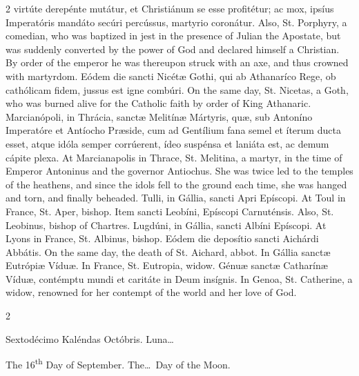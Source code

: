 \begin{paracol}{2}
 virtúte derepénte mutátur, et Christiánum se esse profitétur; ac mox, ipsíus 
 Imperatóris mandáto secúri percússus, martyrio coronátur.
\switchcolumn
{}
Also, St. Porphyry, a comedian, who 
 was baptized in jest in the presence of Julian the Apostate, but was 
 suddenly converted by the power of God and declared himself a Christian. 
 By order of the emperor he was thereupon struck with an axe, and thus 
 crowned with martyrdom.
\switchcolumn*
{}
Eódem die sancti Nicétæ 
 Gothi, qui ab Athanaríco Rege, ob cathólicam fidem, jussus est igne combúri.
\switchcolumn
{}
On the same day, St. Nicetas, a 
 Goth, who was burned alive for the Catholic faith by order of King Athanaric.
\switchcolumn*
{}
Marcianópoli, in 
 Thrácia, sanctæ Melitínæ Mártyris, quæ, sub Antoníno Imperatóre et Antíocho 
 Præside, cum ad Gentílium fana semel et íterum ducta esset, atque idóla 
 semper corrúerent, ídeo suspénsa et laniáta est, ac demum cápite plexa.
\switchcolumn
{}
At Marcianapolis in Thrace, St. 
 Melitina, a martyr, in the time of Emperor Antoninus and the governor 
 Antiochus. She was twice led to the temples of the heathens, and since 
 the idols fell to the ground each time, she was hanged and torn, and finally 
 beheaded.
\switchcolumn*
{}
Tulli, in Gállia, 
 sancti Apri Epíscopi.
\switchcolumn
{}
At Toul in France, St. Aper, bishop.
\switchcolumn*
{}
Item sancti Leobíni, 
 Epíscopi Carnuténsis.
\switchcolumn
{}
Also, St. Leobinus, bishop of 
 Chartres.
\switchcolumn*
{}
Lugdúni, in Gállia, 
 sancti Albíni Epíscopi.
\switchcolumn
{}
At Lyons in France, St. Albinus, 
 bishop.
\switchcolumn*
{}
Eódem die deposítio 
 sancti Aichárdi Abbátis.
\switchcolumn
{}
On the same day, the death of St. 
 Aichard, abbot.
\switchcolumn*
{}
In Gállia sanctæ 
 Eutrópiæ Víduæ.
\switchcolumn
{}
In France, St. Eutropia, widow.
\switchcolumn*
{}
Génuæ sanctæ Catharínæ 
 Víduæ, contémptu mundi et caritáte in Deum insígnis.
\switchcolumn
{}
In Genoa, St. Catherine, a widow, 
 renowned for her contempt of the world and her love of God.
\switchcolumn*
{}
\end{paracol}


\begin{paracol}{2}
\begin{center}{\color{gregoriocolor} Sextodécimo Kaléndas Octóbris. 
 Luna\dots\ }\end{center}
\switchcolumn
{}
\begin{center}{\color{gregoriocolor} The   16\textsuperscript{th} Day of 
 September. The\dots\ Day of the Moon.}\end{center}
\end{paracol}

